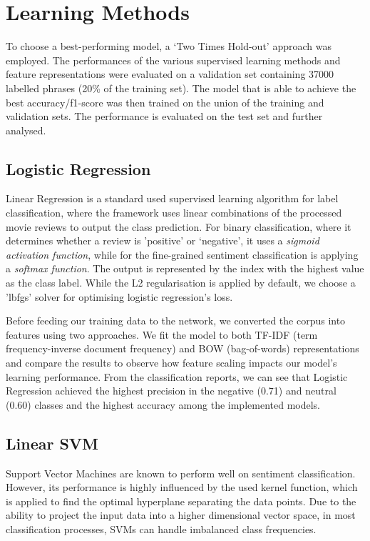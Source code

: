 \documentclass{article}
\begin{document}
\section{Learning Methods}
\label{supervised}

To choose a best-performing model, a `Two Times Hold-out' approach was employed. The performances of the various supervised learning methods and feature representations were evaluated on a validation set containing 37000 labelled phrases (20\% of the training set). The model that is able to achieve the best accuracy/f1-score was then trained on the union of the training and validation sets. The performance is evaluated on the test set and further analysed.


\subsection{Logistic Regression}

Linear Regression is a standard used supervised learning algorithm for label classification, where the framework uses linear combinations of the processed movie reviews to output the class prediction. For binary classification, where it determines whether a review is ’positive’ or ‘negative’, it uses a\textit{ sigmoid activation function}, while for the fine-grained sentiment classification is applying a \textit{softmax function}. The output is represented by the index with the highest value as the class label. While the L2 regularisation is applied by default, we choose a 'lbfgs' solver for optimising logistic regression’s loss.

Before feeding our training data to the network, we converted the corpus into features using two approaches. We fit the model to both TF-IDF (term frequency-inverse document frequency) and BOW (bag-of-words) representations and compare the results to observe how feature scaling impacts our model's learning performance. From the classification reports, we can see that Logistic Regression achieved the highest precision in the negative (0.71) and neutral (0.60) classes and the highest accuracy among the implemented models.

\subsection{Linear SVM}

Support Vector Machines are known to perform well on sentiment classification. However, its performance is highly influenced by the used kernel function, which is applied to find the optimal hyperplane separating the data points. Due to the ability to project the input data into a higher dimensional vector space, in most classification processes, SVMs can handle imbalanced class frequencies.
\end{document}
